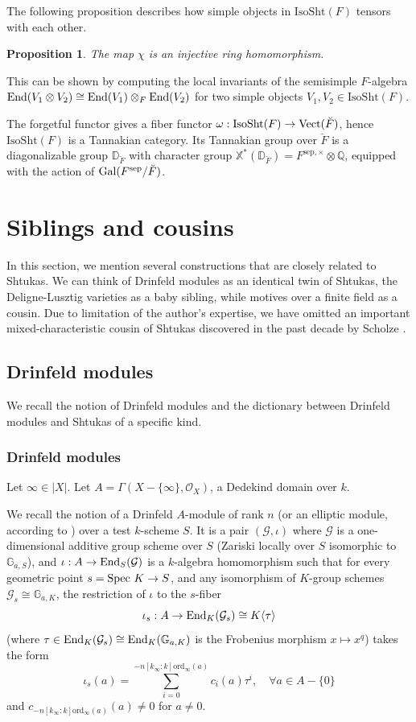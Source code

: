 \documentclass[11pt]{amsart}
\numberwithin{equation}{section}
\theoremstyle{plain}
\newtheorem{prop}[subsubsection]{Proposition}
\theoremstyle{definition}
\def\DD{\mathbb{D}}
\def\GG{\mathbb{G}}
\def\QQ{\mathbb{Q}}
\newcommand\cG{\mathcal{G}}
\newcommand\cO{\mathcal{O}}
\newcommand\Gal{\textup{Gal}}
\newcommand\Spec{\textup{Spec}\ }
\newcommand{\Vect}{\textup{Vect}}
\newcommand\End{\textup{End}}
\newcommand\xch{\mathbb{X}^*}
\renewcommand{\j}[1]{\langle{#1}\rangle}
\newcommand\sss{\subsubsection}
\newcommand\ot{\otimes}
\newcommand\G\Gamma
\newcommand{\io}{\iota}
\renewcommand{\t}{\tau}
\newcommand{\om}{\omega}
\newcommand{\br}{\breve}
\newcommand{\IsoSht}{\mathrm{IsoSht}}
\newcommand{\sep}{\mathrm{sep}}
\newcommand{\ord}{\mathrm{ord}}
\begin{document}
The following proposition describes how simple objects in $\IsoSht(F)$ tensors with each other.
\begin{prop}\label{p:IsoSht tensor} The map $\chi$ is an injective ring homomorphism.
\end{prop}
This can be shown by computing the local invariants of the semisimple $F$-algebra $\End(V_{1}\ot V_{2})\cong\End(V_{1})\ot_{ F}\End(V_{2})$ for two simple objects $V_{1},V_{2}\in \IsoSht(F)$.

The forgetful functor gives  a fiber functor $\om: \IsoSht(F)\to \Vect(\br F)$, hence $\IsoSht(F)$ is a Tannakian category. Its Tannakian group over $\br F$ is a diagonalizable group $\DD_{\br F}$ with character group $\xch(\DD_{\br F})=F^{\sep,\times}\ot\QQ$, equipped with the action of $\Gal(F^{\sep}/\br F)$. 




\section{Siblings and cousins}\label{s:sib}
In this section, we mention several constructions that are closely related to Shtukas. We can think of Drinfeld modules as an identical twin of Shtukas, the Deligne-Lusztig varieties as a baby sibling, while motives over a finite field as a cousin. Due to limitation of the author's expertise, we have omitted an important mixed-characteristic cousin of Shtukas discovered in the past decade by Scholze \cite{S-Berkeley}. 

\subsection{Drinfeld modules} 

We recall the notion of Drinfeld modules and the dictionary between Drinfeld modules and Shtukas of a specific kind.

\sss{Drinfeld modules}
Let $\infty\in |X|$.  Let $A=\G(X-\{\infty\}, \cO_{X})$, a Dedekind domain over $k$.

We recall the notion of a Drinfeld $A$-module of rank $n$ (or an elliptic module, according to \cite{Dr-Ell}) over a test $k$-scheme $S$. It is a pair $(\cG, \io)$ where  $\cG$ is a one-dimensional additive group scheme over $S$ (Zariski locally over $S$ isomorphic to $\GG_{a,S}$), and $\io: A\to \End_{S}(\cG)$ is a $k$-algebra homomorphism such that for every geometric point $s=\Spec K \to  S$, and any isomorphism of $K$-group schemes $\cG_{s}\cong\GG_{a,K}$, the restriction of $\io$ to the $s$-fiber
\begin{equation*}
\io_{s}: A\to \End_{K}(\cG_{s})\cong K\j{\t}
\end{equation*}
(where $\t\in \End_{K}(\cG_{s})\cong\End_{K}(\GG_{a,K})$ is the Frobenius morphism $x\mapsto x^{q}$) takes the form
\begin{equation*}
\io_{s}(a)=\sum_{i=0}^{-n[k_{\infty}:k]\ord_{\infty}(a)}c_{i}(a)\t^{i}, \quad \forall a\in A-\{0\}
\end{equation*}
and $c_{-n[k_{\infty}:k]\ord_{\infty}(a)}(a)\ne0$ for $a\ne0$.
\end{document}
